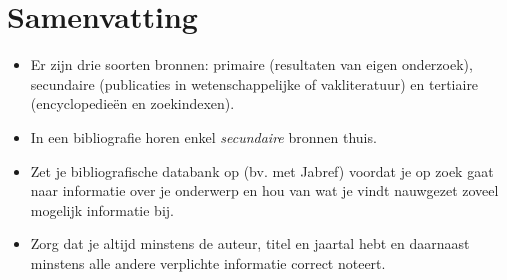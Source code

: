 %

\section{Samenvatting}
\label{sec:literatuuronderzoek_samenvatting}

\begin{itemize}
  \item Er zijn drie soorten bronnen: primaire (resultaten van eigen onderzoek), secundaire (publicaties in wetenschappelijke of vakliteratuur) en tertiaire (encyclopedieën en zoekindexen).
  \item In een bibliografie horen enkel \emph{secundaire} bronnen thuis.
  \item Zet je bibliografische databank op (bv. met Jabref) voordat je op zoek gaat naar informatie over je onderwerp en hou van wat je vindt nauwgezet zoveel mogelijk informatie bij.
  \item Zorg dat je altijd minstens de auteur, titel en jaartal hebt en daarnaast minstens alle andere verplichte informatie correct noteert.
\end{itemize}

